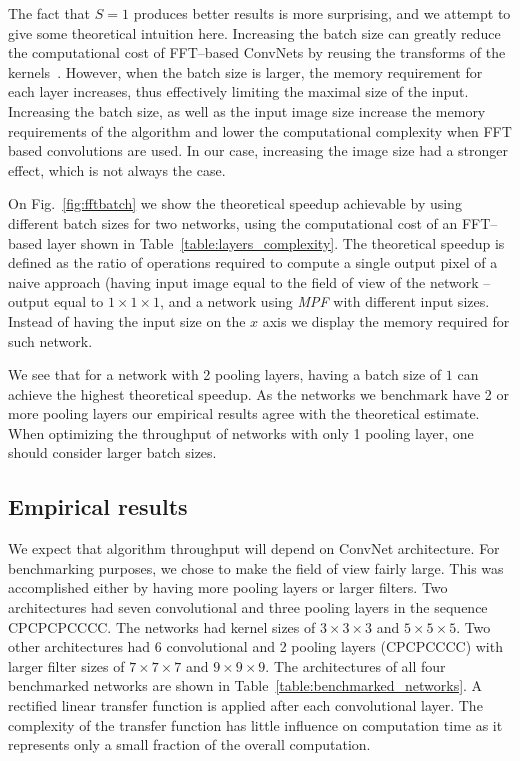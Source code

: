 \documentclass[conference]{./IEEEtran}
\begin{document}
  The fact that $S=1$ produces better results is more surprising, and
  we attempt to give some theoretical intuition here.  Increasing the
  batch size can greatly reduce the computational cost of FFT--based
  ConvNets by reusing the transforms of the
  kernels~\cite{mathieu-iclr-14,vasilache2014fast}.  However, when the
  batch size is larger, the memory requirement for each layer
  increases, thus effectively limiting the maximal size of the input.
  Increasing the batch size, as well as the input image size increase
  the memory requirements of the algorithm and lower the computational
  complexity when FFT based convolutions are used.  In our case,
  increasing the image size had a stronger effect, which is not always
  the case.

  On Fig.~\ref{fig:fftbatch} we show the theoretical speedup
  achievable by using different batch sizes for two networks, using
  the computational cost of an FFT--based layer shown in
  Table~\ref{table:layers_complexity}.  The theoretical speedup is
  defined as the ratio of operations required to compute a single
  output pixel of a naive approach (having input image equal to the
  field of view of the network -- output equal to $1 \times 1 \times
  1$, and a network using \emph{MPF} with different input sizes.
  Instead of having the input size on the $x$ axis we display the
  memory required for such network.

  We see that for a network with 2 pooling layers, having a batch size
  of $1$ can achieve the highest theoretical speedup.  As the networks
  we benchmark have 2 or more pooling layers our empirical results
  agree with the theoretical estimate.  When optimizing the throughput
  of networks with only 1 pooling layer, one should consider larger
  batch sizes.

\subsection{Empirical results}
  We expect that algorithm throughput will depend on ConvNet
  architecture.  For benchmarking purposes, we chose to make the field
  of view fairly large.  This was accomplished either by having more
  pooling layers or larger filters. Two architectures had seven
  convolutional and three pooling layers in the sequence CPCPCPCCCC.
  The networks had kernel sizes of $3\times 3 \times 3$ and $5\times
  5\times 5$.  Two other architectures had 6 convolutional and 2
  pooling layers (CPCPCCCC) with larger filter sizes of $7 \times
  7 \times 7$ and $9 \times 9 \times 9$.  The architectures of all
  four benchmarked networks are shown in
  Table~\ref{table:benchmarked_networks}.  A rectified linear transfer
  function is applied after each convolutional layer.  The complexity
  of the transfer function has little influence on computation
  time as it represents only a small fraction of the overall
  computation.
\end{document}
